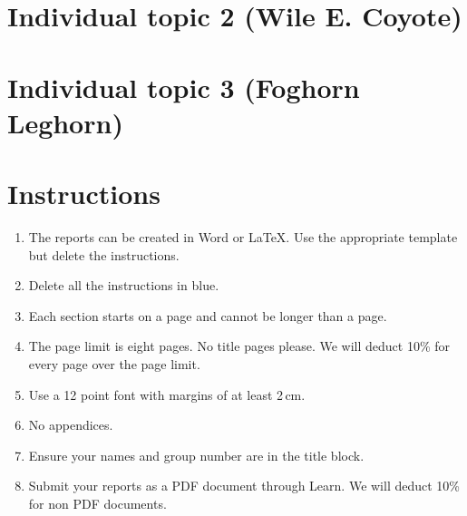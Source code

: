 \documentclass[a4paper,12pt]{article}
\begin{document}
\section{Individual topic 2 (Wile E. Coyote)}


\section{Individual topic 3 (Foghorn Leghorn)}


\color{blue}
\section*{Instructions}

\begin{enumerate}
\item The reports can be created in Word or \LaTeX.  Use the
  appropriate template but delete the instructions.

\item Delete all the instructions in blue.

\item Each section starts on a page and cannot be longer than a page.

\item The page limit is eight pages.  No title pages please.  We will
  deduct 10\% for every page over the page limit.

\item Use a 12 point font with margins of at least 2\,cm.

\item No appendices.

\item Ensure your names and group number are in the title block.

\item Submit your reports as a PDF document through Learn.  We will
  deduct 10\% for non PDF documents.
\end{enumerate}
\end{document}
